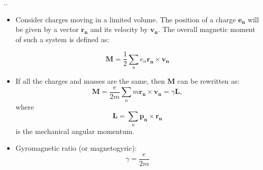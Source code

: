 \documentclass[handout]{beamer}
\begin{document}
\begin{frame}{\thesection.\thesubsection. \insertsubsection}
	
	\begin{itemize}[<+>]
		\item Consider charges moving in a limited volume. The position of a charge $\bm{e_n}$ will be given by a vector $\bm{r_n}$ and its velocity by $\bm{v_n}$. The overall magnetic moment of such a system is defined as:
			
			\begin{equation}
			\bm{M} = \frac{1}{2} \sum_{n} e_n\bm{r_n} \times \bm{v_n}
			\end{equation}
		\item 	If all the charges and masses are the same, then $\bm{M}$ can be rewritten as:	
			\begin{equation} \label{eq:1}
			\bm{M} = \frac{e}{2m} \sum_{n} m\bm{r_n} \times \bm{v_n} = \gamma \bm{L},
			\end{equation}
			where
			\begin{equation}
			\bm{L} = \sum_{n} \bm{p_n} \times \bm{r_n}
			\end{equation}
			is the mechanical angular momentum.
		\item 
			\alert{Gyromagnetic ratio} (or magnetogyric): 
			\begin{equation}
			\gamma = \dfrac{e}{2m}
			\end{equation}
			
	
	\end{itemize}
	


\end{frame}
\end{document}
